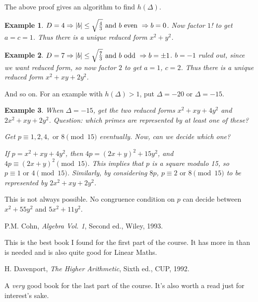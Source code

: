 \documentclass{notes}
\theoremstyle{plain}
\newtheorem*{example}{Example}
\begin{document}
The above proof gives an algorithm to find $h(\Delta)$.

\begin{example}
  $D=4 \Rightarrow \left|b\right| \le \sqrt{\frac{4}{3}} \text{ and } b
  \text{ even } \Rightarrow b=0$.  Now factor $1$! to get $a=c=1$.
  Thus there is a unique reduced form $x^2+y^2$.
\end{example}

\begin{example}
  $D=7 \Rightarrow \left|b\right| \le \sqrt{\frac{7}{3}} \text{ and } b
  \text{ odd } \Rightarrow b=\pm 1$.  $b=-1$ ruled out, since we want
  reduced form, so now factor $2$ to get $a=1$, $c=2$.  Thus there is
  a unique reduced form $x^2+xy+2y^2$.
\end{example}

And so on.  For an example with $h(\Delta)>1$, put $\Delta=-20$ or
$\Delta=-15$.

\begin{example}
  When $\Delta=-15$, get the two reduced forms $x^2+xy+4y^2$ and
  $2x^2+xy+2y^2$.  Question: which primes are represented by at least
  one of these?
  
  Get $p \equiv 1,2,4, \text{ or } 8 \pmod{15}$ eventually.  Now, can
  we decide which one?
  
  If $p=x^2+xy+4y^2$, then $4p = (2x+y)^2+15y^2$, and $4p \equiv
  (2x+y)^2 \pmod{15}$.  This implies that $p$ is a square modulo 15,
  so $p \equiv 1 \text{ or } 4 \pmod{15}$.  Similarly, by considering
  $8p$, $p \equiv 2 \text{ or } 8 \pmod{15}$ to be represented by
  $2x^2+xy+2y^2$.
\end{example}

This is not always possible.  No congruence condition on $p$ can
decide between $x^2+55y^2$ and $5x^2+11y^2$.

\backmatter

\begin{thebibliography}{9}

 P.M. Cohn, \emph{Algebra Vol. 1}, Second ed., Wiley,
  1993.
  
  {\sffamily \small This is the best book I found for the first part
    of the course.  It has more in than is needed and is also quite
    good for Linear Maths.}

 H. Davenport, \emph{The Higher Arithmetic}, Sixth
  ed., CUP, 1992.
  
  {\sffamily \small A \emph{very} good book for the last part of the
    course.  It's also worth a read just for interest's sake. }

\end{thebibliography}
\end{document}
